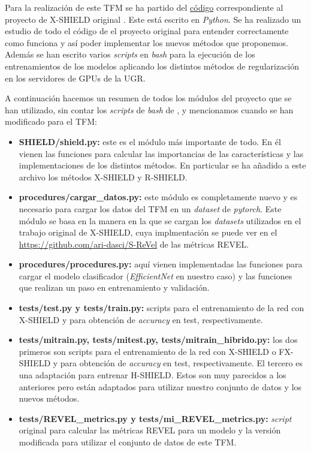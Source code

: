 Para la realización de este TFM se ha partido del \href{https://github.com/isega24/SHIELD/tree/X-SHIELD}{código} correspondiente al proyecto de X-SHIELD original \cite{XSHIELD}. Este está escrito en \textit{Python}. Se ha realizado un estudio de todo el código de el proyecto original para entender correctamente como funciona y así poder implementar los nuevos métodos que proponemos. Además se han escrito varios \textit{scripts} en \textit{bash} para la ejecución de los entrenamientos de los modelos aplicando los distintos métodos de regularización  en los servidores de GPUs de la UGR.

A continuación hacemos un resumen de todos los módulos del proyecto que se han utilizado, sin contar los \textit{scripts} de \textit{bash} de , y mencionamos cuando se han modificado para el TFM:

\begin{itemize}
\item \textbf{SHIELD/shield.py:} este es el módulo más importante de todo. En él vienen las funciones para calcular las importancias de las características y las implementaciones de los distintos métodos. En particular se ha añadido a este archivo los métodos X-SHIELD y R-SHIELD.

\item \textbf{procedures/cargar\_datos.py:} este módulo es completamente nuevo y es necesario para cargar los datos del TFM en un \textit{dataset} de \textit{pytorch}. Este módulo se basa en la manera en la que se cargan los \textit{datasets} utilizados en el trabajo original de X-SHIELD, cuya implmentación se puede ver en el \href{GitHub}{https://github.com/ari-dasci/S-ReVel} de las métricas REVEL.

\item \textbf{procedures/procedures.py:} aquí vienen implementadas las funciones para cargar el modelo clasificador (\textit{EfficientNet} en nuestro caso) y las funciones que realizan un paso en entrenamiento y validación.

\item \textbf{tests/test.py y tests/train.py:} scripts para el entrenamiento de la red con X-SHIELD y para obtención de \textit{accuracy} en test, respectivamente.

\item \textbf{tests/mitrain.py, tests/mitest.py, tests/mitrain\_hibrido.py:} los dos primeros son scripts para el entrenamiento de la red con X-SHIELD o FX-SHIELD y para obtención de \textit{accuracy} en test, respectivamente. El tercero es una adaptación para entrenar H-SHIELD. Estos son muy parecidos a los anteriores pero están adaptados para utilizar nuestro conjunto de datos y los nuevos métodos.

\item \textbf{tests/REVEL\_metrics.py y tests/mi\_REVEL\_metrics.py:} \textit{script} original para calcular las métricas REVEL para un modelo y la versión modificada para utilizar el conjunto de datos de este TFM.
\end{itemize}

